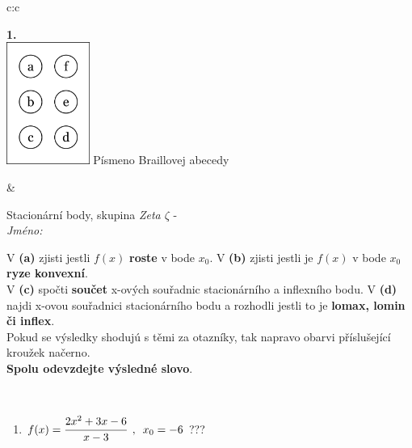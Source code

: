 \documentclass[10pt]{report}
\begin{document}
\begin{tabular}{c:c}
\begin{minipage}[c][104.5mm][t]{0.5\linewidth}
\begin{center}
\begin{minipage}{0.79\linewidth}
\end{minipage}
\begin{minipage}{0.20\linewidth}
\begin{center}
{\Huge\bfseries 1.} \\[2mm]
\includegraphics[height=40mm]{../images/braille.png}
{\small Písmeno Braillovej abecedy}
\end{center}
\end{minipage}
\end{center}
\end{minipage}
&
\begin{minipage}[c][104.5mm][t]{0.5\linewidth}
\begin{center}
\vspace{7mm}
{\huge Stacionární body, skupina \textit{Zeta $\zeta$} -}\\[5mm]
\textit{Jméno:}\phantom{xxxxxxxxxxxxxxxxxxxxxxxxxxxxxxxxxxxxxxxxxxxxxxxxxxxxxxxxxxxxxxxxx}\\[5mm]
\begin{minipage}{0.95\linewidth}
\begin{center}
{\small V \textbf{(a)} zjisti jestli $f(x)$ \textbf{roste} v bode $x_0$. V \textbf{(b)} zjisti jestli je $f(x)$ v bode $x_0$ \textbf{ryze konvexní}.\\V \textbf{(c)} spočti \textbf{součet} x-ových souřadnic stacionárního a inflexního bodu. V \textbf{(d)} najdi x-ovou souřadnici stacionárního bodu a rozhodli jestli to je \textbf{lomax, lomin či inflex}.\\Pokud se výsledky shodujú s těmi za otazníky, tak napravo obarvi příslušející kroužek načerno.\\\textbf{Spolu odevzdejte výsledné slovo}}.
\end{center}
\end{minipage}
\\[1mm]
\begin{minipage}{0.79\linewidth}
\begin{center}
\begin{varwidth}{\linewidth}
\begin{enumerate}
\normalsize
\item $f(x)=\cfrac{2x^2+3x-6}{x-3}\enspace , \enspace x_0=-6$\quad \dotfill\; ???\;\dotfill \quad {}

\end{enumerate}
\end{varwidth}
\end{center}
\end{minipage}
\end{center}
\end{minipage}
\end{tabular}
\end{document}
